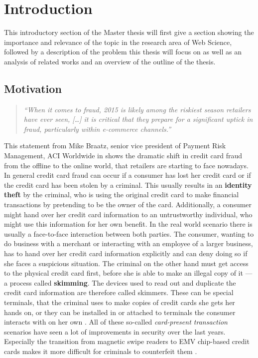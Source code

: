 
\chapter{Introduction} %
\label{cha:introduction}

This introductory section of the Master thesis will first give a section showing the importance and relevance of the topic in the research area of Web Science,
followed by a description of the problem this thesis will focus on as well as an analysis of related works and an overview of the outline of the thesis.

\section{Motivation}
\label{sec:motivation}

\begin{quotation}
    \textit{\enquote{When it comes to fraud, 2015 is likely among the riskiest season retailers have ever seen, […]
    it is critical that they prepare for a significant uptick in fraud, particularly within e-commerce channels.}}
\end{quotation}
This statement from Mike Braatz, senior vice president of Payment Risk Management, ACI Worldwide in \citep{Reuters2015}
shows the dramatic shift in credit card fraud from the offline to the online world, that retailers are starting to face
nowadays. \\

In general credit card fraud can occur if a consumer has lost her credit card or if the credit card has been stolen
by a criminal. This usually results in an \textbf{identity theft} by the criminal, who is using the original credit card
to make financial transactions by pretending to be the owner of the card. Additionally, a consumer might hand over her
credit card information to an untrustworthy individual, who might use this information for her own benefit.
In the real world scenario there is usually a face-to-face interaction between both parties.
The consumer, wanting to do business with a merchant or interacting with an employee of a larger business, has to hand over
her credit card information explicitly and can deny doing so if she faces a suspicious situation.
The criminal on the other hand must get access to the physical credit card first, before she is able to make an
illegal copy of it --- a process called \textbf{skimming}. The devices used to read out and duplicate the credit card
information are therefore called skimmers. These can be special terminals, that the criminal uses to make copies of
credit cards she gets her hands on, or they can be installed in or attached to terminals the consumer interacts with on her own
\citep{ConsumerAction2009}. All of these so-called \textit{card-present transaction} scenarios have seen a lot of improvements in security
over the last years. Especially the transition from magnetic swipe readers to EMV chip-based credit cards makes it more difficult
for criminals to counterfeit them \citep{Lewis2015}. \\

